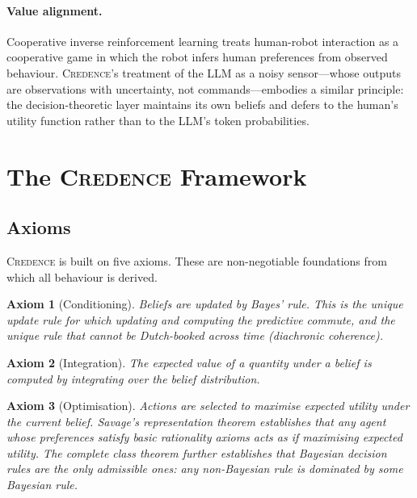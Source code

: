 \documentclass[11pt]{article}
\newcommand{\credence}{\textsc{Credence}}
\newtheorem{axiom}{Axiom}
\begin{document}
\paragraph{Value alignment.} Cooperative inverse reinforcement learning \citep{hadfield2016cooperative} treats human-robot interaction as a cooperative game in which the robot infers human preferences from observed behaviour. \credence{}'s treatment of the LLM as a noisy sensor---whose outputs are observations with uncertainty, not commands---embodies a similar principle: the decision-theoretic layer maintains its own beliefs and defers to the human's utility function rather than to the LLM's token probabilities.


\section{The \credence{} Framework}
\label{sec:framework}

\subsection{Axioms}
\label{sec:axioms}

\credence{} is built on five axioms. These are non-negotiable foundations from which all behaviour is derived.

\begin{axiom}[Conditioning]
Beliefs are updated by Bayes' rule. This is the unique update rule for which updating and computing the predictive commute, and the unique rule that cannot be Dutch-booked across time (diachronic coherence).
\end{axiom}

\begin{axiom}[Integration]
The expected value of a quantity under a belief is computed by integrating over the belief distribution.
\end{axiom}

\begin{axiom}[Optimisation]
Actions are selected to maximise expected utility under the current belief. Savage's representation theorem \citep{savage1954foundations} establishes that any agent whose preferences satisfy basic rationality axioms acts as if maximising expected utility. The complete class theorem \citep{wald1950statistical, berger1985statistical} further establishes that Bayesian decision rules are the only admissible ones: any non-Bayesian rule is dominated by some Bayesian rule.
\end{axiom}
\end{document}
